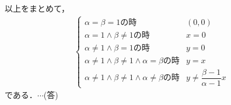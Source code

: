 \documentclass[../../main.tex]{subfiles}
\begin{document}
以上をまとめて，
\begin{align}
  \begin{cases}
    \alpha=\beta=1\text{の時}&(0,0) \\
    \alpha=1\land\beta\not=1\text{の時}&x=0 \\
    \alpha\not=1\land\beta=1\text{の時}&y=0 \\
    \alpha\not=1\land\beta\not=1\land\alpha=\beta\text{の時}&y=x \\
    \alpha\not=1\land\beta\not=1\land\alpha\not=\beta\text{の時}&y\neq \dfrac{\beta-1}{\alpha-1}x
  \end{cases}
\end{align}
である．$\cdots$(答)
\newpage
\end{document}

